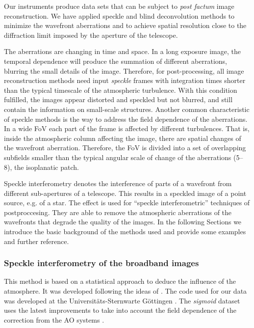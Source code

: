 Our instruments produce data sets that can be subject to \emph{post factum} image reconstruction. We have applied speckle and blind deconvolution methods to minimize the wavefront aberrations and to achieve spatial resolution close to the diffraction limit imposed by the aperture of the telescope. 

The aberrations are changing in time and space. In a long exposure image, the temporal dependence will produce the summation of different aberrations, blurring the small details of the image.  Therefore, for post-processing, all image reconstruction methods need input \emph{speckle} frames with integration times shorter than the typical timescale of the atmospheric turbulence. With this condition fulfilled, the images appear distorted and speckled but not blurred, and still contain the information on small-scale structures. Another common characteristic of speckle methods is the way to address the field dependence of the aberrations. In a wide FoV each part of the frame is affected by different turbulences. That is, inside the atmospheric column affecting the image, there are spatial changes of the wavefront aberration. Therefore, the FoV is divided into a set of overlapping subfields smaller than the typical angular scale of change of the aberrations (5\arcsec -- 8\arcsec), the isoplanatic patch.



Speckle interferometry denotes the interference of parts of a wavefront from different sub-apertures of a telescope. This results in a speckled image of a point source, e.g. of a  star. The effect is used for ``speckle interferometric'' techniques of postproccesing. They are able to remove the atmospheric aberrations of the wavefronts that degrade the quality of the images. In the following Sections we introduce the basic background of the methods used and provide some examples and further reference.

\subsubsection{Speckle interferometry of the broadband images\label{SIb}}
This method is based on a statistical approach to deduce the influence of the atmosphere. It was developed following the ideas of \cite{1965JOSA...55.1427F,1970A&A.....6...85L,1973JOSA...63..971K,1977OptCo..21...55W,von-der-Luehe:1984fk} . The code used for our data was developed at the  Universit\"ats-Sternwarte G\"ottingen \citep{1996A&AS..120..195D} . The \emph{sigmoid} dataset uses the latest improvements to take into account the field dependence of the correction from the AO systems \citep{2006A&A...454.1011P}.

